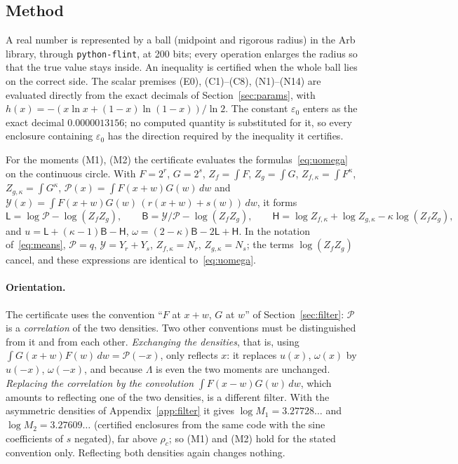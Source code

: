 \documentclass[11pt]{article}
\theoremstyle{definition}
\newcommand{\eps}{\varepsilon}
\begin{document}
\subsection{Method}
A real number is represented by a ball (midpoint and rigorous radius) in the Arb library, through
\texttt{python-flint}, at 200 bits; every operation enlarges the radius so that the true value stays inside. An
inequality is certified when the whole ball lies on the correct side. The scalar premises \textup{(E0)},
\textup{(C1)--(C8)}, \textup{(N1)--(N14)} are evaluated directly from the exact decimals of Section~\ref{sec:params},
with $h(x)=-(x\ln x+(1-x)\ln(1-x))/\ln2$. The constant $\eps_0$ enters as the exact decimal $0.0000013156$; no
computed quantity is substituted for it, so every enclosure containing $\eps_0$ has the direction required by the
inequality it certifies.

For the moments \textup{(M1)}, \textup{(M2)} the certificate evaluates the formulas~\eqref{eq:uomega} on the
continuous circle. With $F=2^r$, $G=2^s$, $Z_f=\int F$, $Z_g=\int G$, $Z_{f,\kappa}=\int F^\kappa$,
$Z_{g,\kappa}=\int G^\kappa$, $\mathcal P(x)=\int F(x+w)G(w)\,dw$ and
$\mathcal Y(x)=\int F(x+w)G(w)\,(r(x+w)+s(w))\,dw$, it forms
\[
 \mathsf L=\log\mathcal P-\log(Z_fZ_g),\qquad\mathsf B=\mathcal Y/\mathcal P-\log(Z_fZ_g),\qquad
 \mathsf H=\log Z_{f,\kappa}+\log Z_{g,\kappa}-\kappa\log(Z_fZ_g),
\]
and $u=\mathsf L+(\kappa-1)\mathsf B-\mathsf H$, $\omega=(2-\kappa)\mathsf B-2\mathsf L+\mathsf H$. In the notation
of~\eqref{eq:means}, $\mathcal P=q$, $\mathcal Y=Y_r+Y_s$, $Z_{f,\kappa}=N_r$, $Z_{g,\kappa}=N_s$; the terms
$\log(Z_fZ_g)$ cancel, and these expressions are identical to~\eqref{eq:uomega}.

\paragraph{Orientation.} The certificate uses the convention ``$F$ at $x+w$, $G$ at $w$'' of
Section~\ref{sec:filter}: $\mathcal P$ is a \emph{correlation} of the two densities. Two other conventions must be
distinguished from it and from each other. \emph{Exchanging the densities}, that is, using
$\int G(x+w)F(w)\,dw=\mathcal P(-x)$, only reflects $x$: it replaces $u(x)$, $\omega(x)$ by $u(-x)$, $\omega(-x)$,
and because $\Lambda$ is even the two moments are unchanged. \emph{Replacing the correlation by the convolution}
$\int F(x-w)G(w)\,dw$, which amounts to reflecting one of the two densities, is a different filter. With the
asymmetric densities of Appendix~\ref{app:filter} it gives $\log M_1=3.27728\ldots$ and $\log M_2=3.27609\ldots$
(certified enclosures from the same code with the sine coefficients of $s$ negated), far above $\rho_c$; so
\textup{(M1)} and \textup{(M2)} hold for the stated convention only. Reflecting both densities again changes
nothing.
\end{document}
